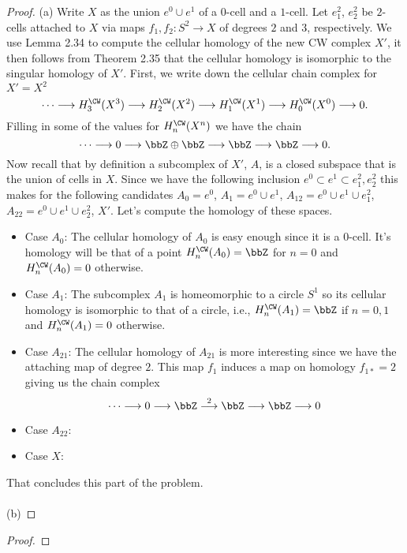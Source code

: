 \begin{proof}
(a) Write $X$ as the union $e^0\cup e^1$ of a $0$-cell and a $1$-cell. Let
$e^2_1$, $e^2_2$ be $2$-cells attached to $X$ via maps $f_1,f_2\colon
S^2\to X$ of degrees $2$ and $3$, respectively. We use Lemma 2.34 to
compute the cellular homology of the new CW complex $X'$, it then follows
from Theorem 2.35 that the cellular homology is isomorphic to the singular
homology of $X'$. First, we write down the cellular chain complex for
$X'=X^2$
\begin{equation}
\label{eq:cellular-chain-x}
\cdots\longrightarrow
H_3^\CW(X^3)\longrightarrow
H_2^\CW(X^2)\longrightarrow
H_1^\CW(X^1)\longrightarrow
H_0^\CW(X^0)\longrightarrow
0.
\end{equation}
Filling in some of the values for $H_n^\CW(X^n)$ we have the chain
\begin{equation}
\label{eq:cellular-chain-x-2}
\cdots\longrightarrow
0\longrightarrow
\bbZ\oplus\bbZ\longrightarrow
\bbZ\longrightarrow
\bbZ\longrightarrow
0.
\end{equation}
Now recall that by definition a subcomplex of $X'$, $A$, is a closed
subspace that is the union of cells in $X$. Since we have the following
inclusion $e^0\subset e^1\subset e_1^2,e_2^2$ this makes for the following
candidates $A_0= e^0$, $A_1= e^0\cup e^1$, $A_{12}=
e^0\cup e^1\cup e_1^2$,
$A_{22}= e^0\cup e^1\cup e_2^2$, $X'$. Let's compute the homology
of these spaces.
\begin{itemize}
\item Case $A_0$: The cellular homology of $A_0$ is easy enough since it
is a $0$-cell. It's homology will be that of a point $H_n^\CW(A_0)=\bbZ$
for $n=0$ and $H_n^\CW(A_0)=0$ otherwise.
\item Case $A_1$: The subcomplex $A_1$ is homeomorphic to a circle $S^1$ so
  its cellular homology is isomorphic to that of a circle, i.e.,
  $H_n^\CW(A_1)=\bbZ$ if $n=0,1$ and $H_n^\CW(A_1)=0$ otherwise.
\item Case $A_{21}$: The cellular homology of $A_{21}$ is more
  interesting since we have the attaching map of degree $2$. This map $f_1$
  induces a map on homology $f_{1*}=2$ giving us the chain complex
  \begin{equation}
  \label{eq:chain-complex-a-1-2}
  \cdots\longrightarrow
  0\longrightarrow
  \bbZ\overset{2}{\longrightarrow}
  \bbZ\longrightarrow
  \bbZ\longrightarrow
  0
  \end{equation}
\item Case $A_{22}$:
\item Case $X$:
\end{itemize}
That concludes this part of the problem.
\\\\
(b)
\end{proof}
\newpage

\begin{problem}
\end{problem}
\begin{proof}
\end{proof}

